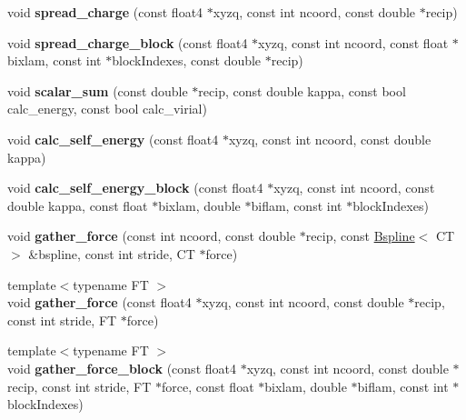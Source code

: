 \begin{DoxyCompactItemize}
\item 
\hypertarget{classCudaPMERecip_a2ae3f80940f7b2d3ded80a29650be9cf}{}\label{classCudaPMERecip_a2ae3f80940f7b2d3ded80a29650be9cf} 
void {\bfseries spread\+\_\+charge} (const float4 $\ast$xyzq, const int ncoord, const double $\ast$recip)
\item 
\hypertarget{classCudaPMERecip_a5a51525491c0ba1d6e6c941976333ae3}{}\label{classCudaPMERecip_a5a51525491c0ba1d6e6c941976333ae3} 
void {\bfseries spread\+\_\+charge\+\_\+block} (const float4 $\ast$xyzq, const int ncoord, const float $\ast$bixlam, const int $\ast$block\+Indexes, const double $\ast$recip)
\item 
\hypertarget{classCudaPMERecip_a62b0e684d24e90eb8073200eff211f54}{}\label{classCudaPMERecip_a62b0e684d24e90eb8073200eff211f54} 
void {\bfseries scalar\+\_\+sum} (const double $\ast$recip, const double kappa, const bool calc\+\_\+energy, const bool calc\+\_\+virial)
\item 
\hypertarget{classCudaPMERecip_a254ebf794806e929ee52c2afba4c5b1d}{}\label{classCudaPMERecip_a254ebf794806e929ee52c2afba4c5b1d} 
void {\bfseries calc\+\_\+self\+\_\+energy} (const float4 $\ast$xyzq, const int ncoord, const double kappa)
\item 
\hypertarget{classCudaPMERecip_a6e59ee35b534eefeba47a1bd2ccf6e4c}{}\label{classCudaPMERecip_a6e59ee35b534eefeba47a1bd2ccf6e4c} 
void {\bfseries calc\+\_\+self\+\_\+energy\+\_\+block} (const float4 $\ast$xyzq, const int ncoord, const double kappa, const float $\ast$bixlam, double $\ast$biflam, const int $\ast$block\+Indexes)
\item 
\hypertarget{classCudaPMERecip_a9851647dc81ec97299ec48757f758364}{}\label{classCudaPMERecip_a9851647dc81ec97299ec48757f758364} 
void {\bfseries gather\+\_\+force} (const int ncoord, const double $\ast$recip, const \hyperlink{classBspline}{Bspline}$<$ CT $>$ \&bspline, const int stride, CT $\ast$force)
\item 
\hypertarget{classCudaPMERecip_af4ae56f936724b33327b4b252f25a0cd}{}\label{classCudaPMERecip_af4ae56f936724b33327b4b252f25a0cd} 
{\footnotesize template$<$typename FT $>$ }\\void {\bfseries gather\+\_\+force} (const float4 $\ast$xyzq, const int ncoord, const double $\ast$recip, const int stride, FT $\ast$force)
\item 
\hypertarget{classCudaPMERecip_a1545f894c2fd03387dd159af7939a8e3}{}\label{classCudaPMERecip_a1545f894c2fd03387dd159af7939a8e3} 
{\footnotesize template$<$typename FT $>$ }\\void {\bfseries gather\+\_\+force\+\_\+block} (const float4 $\ast$xyzq, const int ncoord, const double $\ast$recip, const int stride, FT $\ast$force, const float $\ast$bixlam, double $\ast$biflam, const int $\ast$block\+Indexes)

\end{DoxyCompactItemize}
